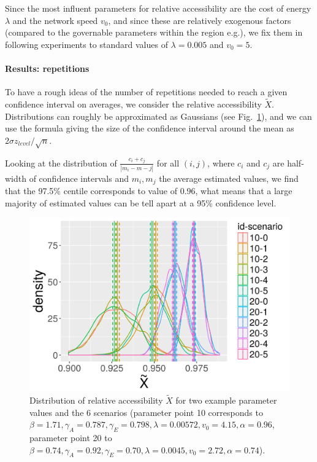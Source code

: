 Since the most influent parameters for relative accessibility are the cost of energy $\lambda$ and the network speed $v_0$, and since these are relatively exogenous factors (compared to the governable parameters within the region e.g.), we fix them in following experiments to standard values of $\lambda = 0.005$ and $v_0 = 5$.


\paragraph{Results: repetitions}

To have a rough ideas of the number of repetitions needed to reach a given confidence interval on averages, we consider the relative accessibility $\tilde{X}$. Distributions can roughly be approximated as Gaussians (see Fig.~\ref{fig:distrib-access}), and we can use the formula giving the size of the confidence interval around the mean as $2\sigma z_{level} / \sqrt{n}$.

Looking at the distribution of $\frac{c_i + c_j}{\left|m_i - m-j\right|}$ for all $(i,j)$, where $c_i$ and $c_j$ are half-width of confidence intervals and $m_i,m_j$ the average estimated values, we find that the 97.5\% centile corresponds to value of 0.96, what means that a large majority of estimated values can be tell apart at a 95\% confidence level.


\begin{figure}
	\includegraphics[width=\textwidth]{figures/20180417_184334_SPACEMATTERS_distrib_relativeAccessibility.png}
	\caption{Distribution of relative accessibility $\tilde{X}$ for two example parameter values and the 6 scenarios (parameter point 10 corresponds to $\beta = 1.71,\gamma_A=0.787,\gamma_E=0.798,\lambda=0.00572,v_0=4.15,\alpha=0.96$, parameter point 20 to $\beta = 0.74,\gamma_A=0.92,\gamma_E=0.70,\lambda=0.0045,v_0=2.72,\alpha=0.74$).\label{fig:distrib-access}}
\end{figure}



